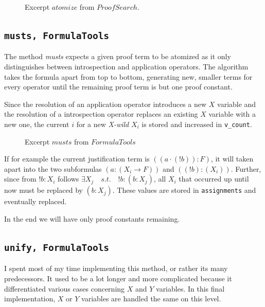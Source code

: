 \begin{figure}[H]
	\caption{Excerpt $atomize$ from $ProofSearch$.}
    \vspace{-10pt}
	
	\vspace{-10pt}
\end{figure}

\subsection[musts]{\texttt{musts, FormulaTools}}
The method \emph{musts} expects a given proof term to be atomized as it only distinguishes between introspection and application operators.
The algorithm takes the formula apart from top to bottom, generating new, smaller terms for every operator until the remaining proof term is but one proof constant. 

Since the resolution of an application operator introduces a new $X$ variable and the resolution of a introspection operator replaces an existing $X$ variable with a new one, the current $i$ for a new \emph{X-wild} $X_i$ is stored and increased in \texttt{v\_count}.

\begin{figure}[H]
	\caption{Excerpt $musts$ from $FormulaTools$}
    \vspace{-10pt}
	
	\vspace{-10pt}
\end{figure}

If for example the current justification term is $((a\cdot (!b)):F)$, it will taken apart into the two subformulas $(a:(X_i\rightarrow F))$ and $((!b):(X_i))$. Further, since from $!b:X_i$ follows $\exists X_j \quad s.t. \quad !b:(b:X_j)$, all $X_i$ that occurred up until now must be replaced by $(b:X_j)$. These values are stored in \texttt{assignments} and eventually replaced. 

In the end we will have only proof constants remaining.

\subsection[unify]{\texttt{unify, FormulaTools}}
I spent most of my time implementing this method, or rather its many predecessors. It used to be a lot longer and more complicated because it differentiated various cases concerning $X$ and $Y$ variables. In this final implementation, $X$ or $Y$ variables are handled the same on this level.

